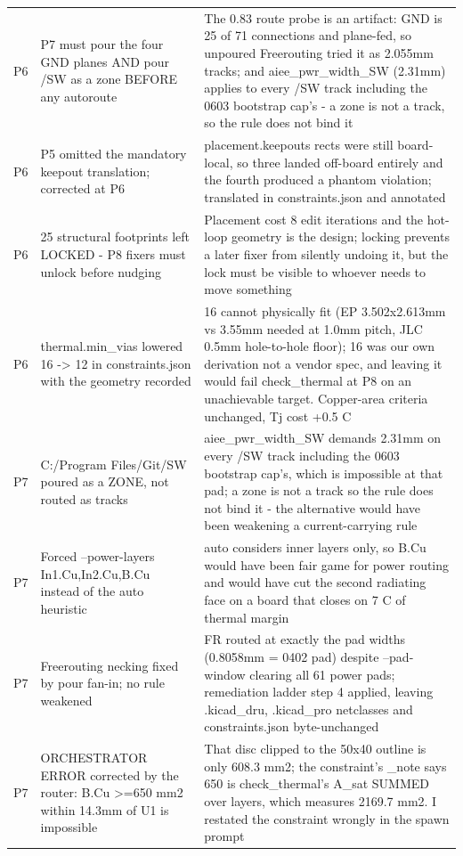 \documentclass[11pt,a4paper]{article}
\begin{document}
{\begin{longtable}{lp{5.2cm}p{7.2cm}}
P6 & P7 must pour the four GND planes AND pour /SW as a zone BEFORE any autoroute & The 0.83 route probe is an artifact: GND is 25 of 71 connections and plane-fed, so unpoured Freerouting tried it as 2.055mm tracks; and aiee\_pwr\_width\_SW (2.31mm) applies to every /SW track including the 0603 bootstrap cap's - a zone is not a track, so the rule does not bind it \\
P6 & P5 omitted the mandatory keepout translation; corrected at P6 & placement.keepouts rects were still board-local, so three landed off-board entirely and the fourth produced a phantom violation; translated in constraints.json and annotated \\
P6 & 25 structural footprints left LOCKED - P8 fixers must unlock before nudging & Placement cost 8 edit iterations and the hot-loop geometry is the design; locking prevents a later fixer from silently undoing it, but the lock must be visible to whoever needs to move something \\
P6 & thermal.min\_vias lowered 16 -\textgreater{} 12 in constraints.json with the geometry recorded & 16 cannot physically fit (EP 3.502x2.613mm vs 3.55mm needed at 1.0mm pitch, JLC 0.5mm hole-to-hole floor); 16 was our own derivation not a vendor spec, and leaving it would fail check\_thermal at P8 on an unachievable target. Copper-area criteria unchanged, Tj cost +0.5 C \\
P7 & C:/Program Files/Git/SW poured as a ZONE, not routed as tracks & aiee\_pwr\_width\_SW demands 2.31mm on every /SW track including the 0603 bootstrap cap's, which is impossible at that pad; a zone is not a track so the rule does not bind it - the alternative would have been weakening a current-carrying rule \\
P7 & Forced --power-layers In1.Cu,In2.Cu,B.Cu instead of the auto heuristic & auto considers inner layers only, so B.Cu would have been fair game for power routing and would have cut the second radiating face on a board that closes on 7 C of thermal margin \\
P7 & Freerouting necking fixed by pour fan-in; no rule weakened & FR routed at exactly the pad widths (0.8058mm = 0402 pad) despite --pad-window clearing all 61 power pads; remediation ladder step 4 applied, leaving .kicad\_dru, .kicad\_pro netclasses and constraints.json byte-unchanged \\
P7 & ORCHESTRATOR ERROR corrected by the router: B.Cu \textgreater{}=650 mm2 within 14.3mm of U1 is impossible & That disc clipped to the 50x40 outline is only 608.3 mm2; the constraint's \_note says 650 is check\_thermal's A\_sat SUMMED over layers, which measures 2169.7 mm2. I restated the constraint wrongly in the spawn prompt \\

\end{longtable}}
\end{document}
